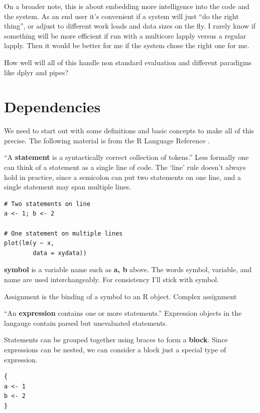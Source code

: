 \documentclass[12pt]{article}
\begin{document}
On a broader note, this is about embedding more intelligence into the code
and the system. As an end user it's convenient if a system will just ``do
the right thing'', or adjust to different work loads and data sizes on the
fly. I rarely know if something will be more efficient if
run with a multicore lapply versus a regular lapply. Then it would be
better for me if the system chose the right one for me.

How well will all of this handle non standard evaluation and different
paradigms like dplyr and pipes?

\section{Dependencies}

We need to start out with some definitions and basic concepts to make all
of this precise. The following material is from the R
Language Reference \cite{Rlang}.

``A \textbf{statement} is a
syntactically correct collection of tokens.'' Less formally one can think of
a statement as a single line of code. The `line' rule doesn't always hold in practice,
since a semicolon can put two statements on one line, and a single
statement may span multiple lines.

\begin{verbatim}
# Two statements on line
a <- 1; b <- 2

# One statement on multiple lines
plot(lm(y ~ x,
        data = xydata))
\end{verbatim}

\textbf{symbol} is a variable name such as \textbf{a, b} above.  The words
symbol, variable, and name are used interchangeably. For consistency I'll
stick with symbol.

Assignment is the binding of a symbol to an R object. Complex assignment

``An \textbf{expression} contains one or more statements.'' Expression objects
in the langauge contain parsed but unevaluated statements. 

Statements can be grouped together using braces to form a \textbf{block}.
Since expressions can be nested, we can consider a block just a special
type of expression.

\begin{verbatim}
{
a <- 1
b <- 2
}
\end{verbatim}
\end{document}
